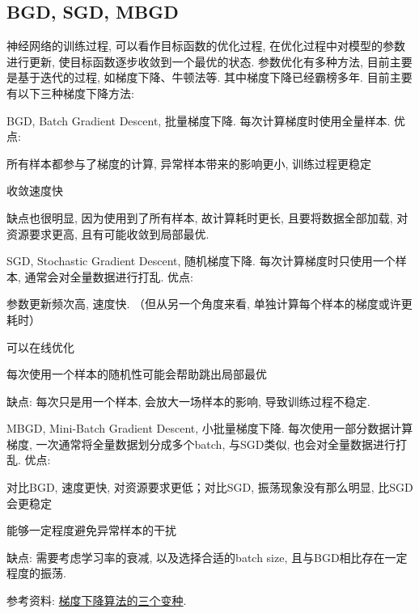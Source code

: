 \subsection{BGD, SGD, MBGD}
神经网络的训练过程, 可以看作目标函数的优化过程, 在优化过程中对模型的参数进行更新, 使目标函数逐步收敛到一个最优的状态. 参数优化有多种方法, 目前主要是基于迭代的过程, 如梯度下降、牛顿法等. 其中梯度下降已经霸榜多年. 目前主要有以下三种梯度下降方法: 
\begin{myitemize}
	\item BGD, Batch  Gradient Descent, 批量梯度下降. 每次计算梯度时使用全量样本. 优点: 
	\begin{myitemize}
		\item 所有样本都参与了梯度的计算, 异常样本带来的影响更小, 训练过程更稳定
		\item 收敛速度快
	\end{myitemize}
	缺点也很明显, 因为使用到了所有样本, 故计算耗时更长, 且要将数据全部加载, 对资源要求更高, 且有可能收敛到局部最优. 
	
	\item SGD, Stochastic Gradient Descent, 随机梯度下降. 每次计算梯度时只使用一个样本, 通常会对全量数据进行打乱. 优点: 
	\begin{myitemize}
		\item 参数更新频次高, 速度快. （但从另一个角度来看, 单独计算每个样本的梯度或许更耗时）
		\item 可以在线优化
		\item 每次使用一个样本的随机性可能会帮助跳出局部最优
	\end{myitemize}
	缺点: 每次只是用一个样本, 会放大一场样本的影响, 导致训练过程不稳定. 
	
	\item MBGD, Mini-Batch Gradient Descent, 小批量梯度下降. 每次使用一部分数据计算梯度, 一次通常将全量数据划分成多个batch, 与SGD类似, 也会对全量数据进行打乱. 优点: 
	\begin{myitemize}
		\item 对比BGD, 速度更快, 对资源要求更低；对比SGD, 振荡现象没有那么明显, 比SGD会更稳定
		\item 能够一定程度避免异常样本的干扰
	\end{myitemize}
	缺点: 需要考虑学习率的衰减, 以及选择合适的batch size, 且与BGD相比存在一定程度的振荡. 
\end{myitemize}
参考资料: \href{https://lumingdong.cn/summary-of-gradient-descent-algorithm.html#%E6%A2%AF%E5%BA%A6%E4%B8%8B%E9%99%8D%E7%AE%97%E6%B3%95%E7%9A%84%E4%B8%89%E4%B8%AA%E5%8F%98%E7%A7%8D}{梯度下降算法的三个变种}. 

